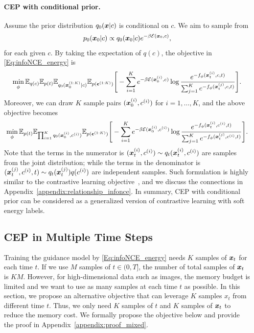 \paragraph{CEP with conditional prior.}
Assume the prior distribution $q_0({\bm{x}}|c)$ is conditional on $c$. We aim to sample from 
\begin{equation}
    p_0({\bm{x}}_0|c) \propto q_0({\bm{x}}_0|c)e^{-\beta{\mathcal{E}}({\bm{x}}_0,c)},
\end{equation}
for each given $c$.
By taking the expectation of $q(c)$, the objective in \eqref{Eq:infoNCE_energy} is
\begin{equation}
\min_\phi \mathbb{E}_{q(c)}\mathbb{E}_{p(t)}\mathbb{E}_{q_0({\bm{x}}_0^{(1:K)}|c)}\mathbb{E}_{p(\bm{\epsilon}^{(1:K)})}\Bigg[
    - \sum_{i=1}^K
     e^{-\beta{\mathcal{E}}({\bm{x}}_0^{(i)}, c)}
    \log \frac{e^{-f_\phi({\bm{x}}_t^{(i)},c,t)}}{\sum_{j=1}^K e^{-f_\phi({\bm{x}}_t^{(j)},c,t)}}
\Bigg].
\end{equation}
Moreover, we can draw $K$ sample pairs $({\bm{x}}_0^{(i)},c^{(i)})$ for $i=1,\dots,K$, and the above objective becomes
\begin{equation}
\min_\phi \mathbb{E}_{p(t)}\mathbb{E}_{\prod_{i=1}^K q_0({\bm{x}}_0^{(i)},c^{(i)})}\mathbb{E}_{p(\bm{\epsilon}^{(1:K)})}\Bigg[
    - \sum_{i=1}^K
     e^{-\beta{\mathcal{E}}({\bm{x}}_0^{(i)}, c^{(i)})}
    \log \frac{e^{-f_\phi({\bm{x}}_t^{(i)},c^{(i)},t)}}{\sum_{j=1}^K e^{-f_\phi({\bm{x}}_t^{(j)},c^{(i)},t)}}
\Bigg].
\end{equation}
Note that the terms in the numerator is $({\bm{x}}_t^{(i)}, c^{(i)})\sim q_t({\bm{x}}_t^{(i)}, c^{(i)})$ are samples from the joint distribution; while the terms in the denominator is $({\bm{x}}_t^{(j)}, c^{(i)}, t) \sim q_t({\bm{x}}_t^{(j)})q(c^{(i)})$ are independent samples. Such formulation is highly similar to the contrastive learning objective~\citep{infoNCE}, and we discuss the connections in Appendix~\ref{appendix:relationship_infonce}. In summary, CEP with conditional prior can be considered as a generalized version of contrastive learning with soft energy labels.




\subsection{CEP in Multiple Time Steps}
Training the guidance model by \eqref{Eq:infoNCE_energy} needs $K$ samples of ${\bm{x}}_t$ for each time $t$. If we use $M$ samples of $t\in(0,T]$, the number of total samples of ${\bm{x}}_t$ is $KM$. However, for high-dimensional data such as images, the memory budget is limited and we want to use as many samples at each time $t$ as possible. In this section, we propose an alternative objective that can leverage $K$ samples $x_t$ from different time $t$. Thus, we only need $K$ samples of $t$ and $K$ samples of ${\bm{x}}_t$ to reduce the memory cost. We formally propose the objective below and provide the proof in Appendix~\ref{appendix:proof_mixed}.

